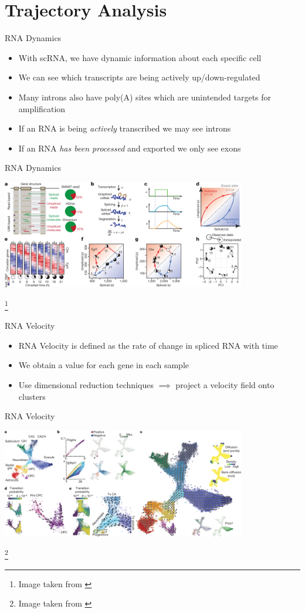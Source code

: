 \documentclass[aspectratio=169,11pt]{beamer}
\newcommand\blfootnote[1]{%
  \begingroup
  \renewcommand\thefootnote{}\footnote{#1}%
  \addtocounter{footnote}{-1}%
  \endgroup
}
\begin{document}
\section{Trajectory Analysis}

\begin{frame}{RNA Dynamics}
	\begin{itemize}
		\item With scRNA, we have dynamic information about each specific cell
		\item We can see which transcripts are being actively up/down-regulated
		\item Many introns also have poly(A) sites which are unintended targets for amplification
		\item If an RNA is being \textit{actively} transcribed we may see introns
		\item If an RNA \textit{has been processed} and exported we only see exons
	\end{itemize}
\end{frame}

\begin{frame}{RNA Dynamics}
	\begin{center}
		\includegraphics[width=0.8\textwidth]{figures/velocityFig1.png} 
	\end{center}
	\blfootnote{Image taken from \cite{pmid30089906}}
	\end{frame}

\begin{frame}{RNA Velocity}
	\begin{itemize}
		\item RNA Velocity is defined as the rate of change in spliced RNA with time
		\item We obtain a value for each gene in each sample
		\item Use dimensional reduction techniques $\implies$ project a velocity field onto clusters
	\end{itemize}
\end{frame}

\begin{frame}{RNA Velocity}
	\begin{center}
	\includegraphics[width=0.8\textwidth]{figures/velocityFig3.png} 
	\end{center}
	\blfootnote{Image taken from \cite{pmid30089906}}
\end{frame}
\end{document}
